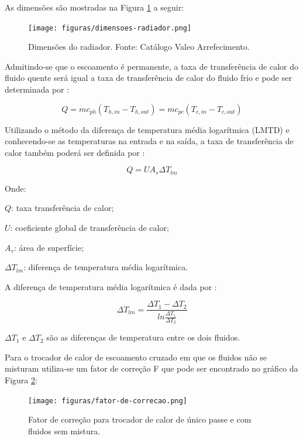As dimensões são mostradas na Figura \ref{dimensoes-radiador} a seguir:

\begin{figure}[h!]
	\centering
	\texttt{[image: figuras/dimensoes-radiador.png]}
	\caption{Dimensões do radiador. Fonte: Catálogo Valeo Arrefecimento.}
	\label{dimensoes-radiador}
\end{figure}

Admitindo-se que o escoamento é permanente, a taxa de transferência de calor do fluido quente será igual a taxa de transferência de calor do fluido frio e pode ser determinada por \cite{energiaTransferencia}:

\begin{equation}
	Q = mc_{ph}(T_{h, in} - T_{h, out}) = mc_{pc}(T_{c, in} - T_{c, out})
\end{equation}

Utilizando o método da diferença de temperatura média logarítmica (LMTD) e conhecendo-se as temperaturas na entrada e na saída, a taxa de transferência de calor também poderá ser definida por \cite{energiaTransferencia}:

\begin{equation}
	Q = UA_{s}\Delta T_{lm}
\end{equation}

Onde:

$Q$: taxa transferência de calor;

$U$: coeficiente global de transferência de calor;

$A_{s}$: área de superfície;

$\Delta T_{lm}$: diferença de temperatura média logarítmica.

A diferença de temperatura média logarítmica é dada por :

\begin{equation}
	\Delta T_{lm} = \frac{\Delta T_{1}-\Delta T_{2}}{ln \frac{\Delta T_{1}}{\Delta T_{2}}}
\end{equation}

$\Delta T_{1}$ e $\Delta T_{2}$ são as diferenças de temperatura entre os dois fluidos.

Para o trocador de calor de escoamento cruzado em que os fluidos não se misturam utiliza-se um fator de correção F que pode ser encontrado no gráfico da Figura \ref{fator-de-correcao}:

\begin{figure}[h!]
	\centering
	\texttt{[image: figuras/fator-de-correcao.png]}
	\caption{Fator de correção para trocador de calor de único passe e com fluidos sem mistura.\cite{energiaTransferencia}}
	\label{fator-de-correcao}
\end{figure}

